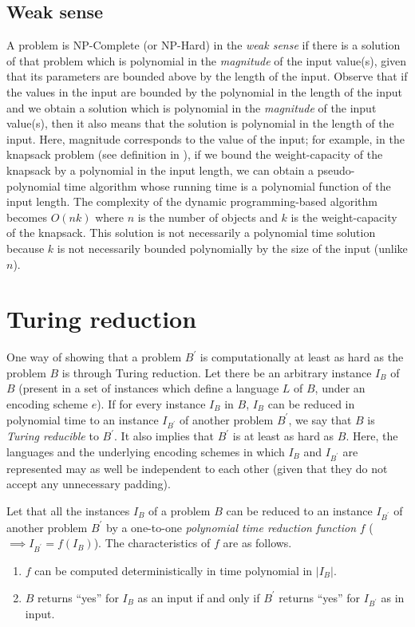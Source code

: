\subsection{Weak sense}

A problem is NP-Complete (or NP-Hard) in the \textit{weak sense} if there is a solution of that problem which is polynomial in the \textit{magnitude} of the input value(s), given that its parameters are bounded above by the length of the input. Observe that if the values in the input are bounded by the polynomial in the length of the input and we obtain a solution which is polynomial in the \textit{magnitude} of the input value(s), then it also means that the solution is polynomial in the length of the input. Here, magnitude corresponds to the value of the input; for example, in the knapsack problem (see definition in ), if we bound the weight-capacity of the knapsack by a polynomial in the input length, we can obtain a pseudo-polynomial time algorithm \cite{Cormen} whose running time is a polynomial function of the input length. The complexity of the dynamic programming-based algorithm becomes $O(nk)$ where $n$ is the number of objects and $k$ is the weight-capacity of the knapsack. This solution is not necessarily a polynomial time solution because $k$ is not necessarily bounded polynomially by the size of the input (unlike $n$).

\section{Turing reduction}\label{section:ptr-pptr-npc}

One way of showing that a problem $B^\prime$ is computationally at least as hard as the problem $B$ is through Turing reduction. Let there be an arbitrary instance $I_B$ of $B$ (present in a set of instances which define a language $L$ of $B$, under an encoding scheme $e$). If for every instance $I_B$ in $B$, $I_B$ can be reduced in polynomial time to an instance $I_{B^\prime}$ of another problem $B^\prime$, we say that $B$ is \textit{Turing reducible} to $B^\prime$. It also implies that $B^\prime$ is at least as hard as $B$. Here, the languages and the underlying encoding schemes in which $I_B$ and $I_{B^\prime}$ are represented may as well be independent to each other (given that they do not accept any unnecessary padding).

Let that all the instances $I_B$ of a problem $B$ can be reduced to an instance $I_{B^\prime}$ of another problem $B^\prime$ by a one-to-one \textit{polynomial time reduction function} $f$ ($\implies I_{B^\prime}=f(I_B)$). The characteristics of $f$ \cite{Garey1979} are as follows.
\begin{enumerate}
    \item $f$ can be computed deterministically in time polynomial in $|I_B|$.
    \item $B$ returns ``yes'' for $I_B$ as an input if and only if $B^\prime$ returns ``yes'' for $I_{B^\prime}$ as in input.
\end{enumerate}

